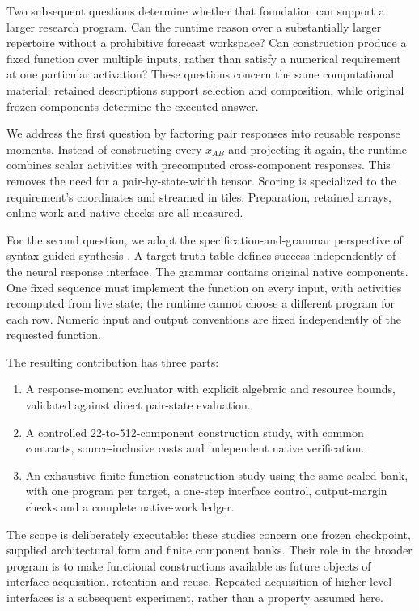 \documentclass[11pt]{article}
\begin{document}
Two subsequent questions determine whether that foundation can support a larger
research program. Can the runtime reason over a substantially larger repertoire
without a prohibitive forecast workspace? Can construction produce a fixed
function over multiple inputs, rather than satisfy a numerical requirement at
one particular activation? These questions concern the same computational
material: retained descriptions support selection and composition, while original
frozen components determine the executed answer.

We address the first question by factoring pair responses into reusable response
moments. Instead of constructing every $x_{AB}$ and projecting it again, the
runtime combines scalar activities with precomputed cross-component responses.
This removes the need for a pair-by-state-width tensor. Scoring is specialized
to the requirement's coordinates and streamed in tiles. Preparation, retained
arrays, online work and native checks are all measured.

For the second question, we adopt the specification-and-grammar perspective of
syntax-guided synthesis \cite{sygus,standard}. A target truth table defines
success independently of the neural response interface. The grammar contains
original native components. One fixed sequence must implement the function on
every input, with activities recomputed from live state; the runtime cannot choose
a different program for each row. Numeric input and output conventions are fixed
independently of the requested function.

The resulting contribution has three parts:
\begin{enumerate}[leftmargin=*,itemsep=0.15em]
\item A response-moment evaluator with explicit algebraic and resource bounds,
      validated against direct pair-state evaluation.
\item A controlled 22-to-512-component construction study, with common contracts,
      source-inclusive costs and independent native verification.
\item An exhaustive finite-function construction study using the same sealed bank,
      with one program per target, a one-step interface control, output-margin
      checks and a complete native-work ledger.
\end{enumerate}

The scope is deliberately executable: these studies concern one frozen checkpoint,
supplied architectural form and finite component banks. Their role in the broader
program is to make functional constructions available as future objects of
interface acquisition, retention and reuse. Repeated acquisition of higher-level
interfaces is a subsequent experiment, rather than a property assumed here.
\end{document}
